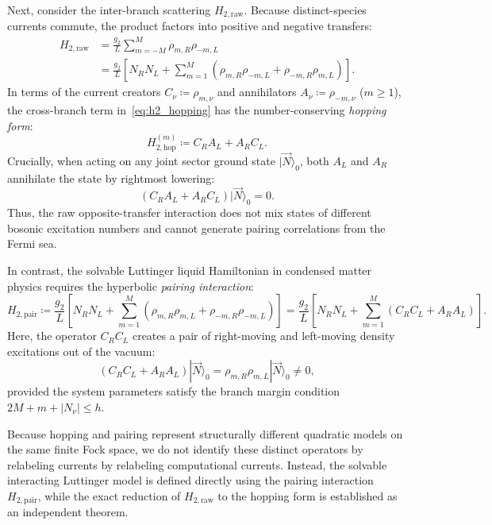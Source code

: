 Next, consider the inter-branch scattering $H_{2, \mathrm{raw}}$. Because distinct-species currents commute, the product factors into positive and negative transfers:
\begin{align}
H_{2, \mathrm{raw}} &= \frac{g_2}{L} \sum_{m=-M}^M \rho_{m, R} \rho_{-m, L} \\
&= \frac{g_2}{L} \left[ N_R N_L + \sum_{m=1}^M \left( \rho_{m, R} \rho_{-m, L} + \rho_{-m, R} \rho_{m, L} \right) \right]. \label{eq:h2_hopping}
\end{align}
In terms of the current creators $C_\nu \coloneqq \rho_{m, \nu}$ and annihilators $A_\nu \coloneqq \rho_{-m, \nu}$ ($m \ge 1$), the cross-branch term in~\eqref{eq:h2_hopping} has the number-conserving \emph{hopping form}:
\begin{equation}
H_{2, \mathrm{hop}}^{(m)} \coloneqq C_R A_L + A_R C_L.
\end{equation}
Crucially, when acting on any joint sector ground state $|\vec{N}\rangle_0$, both $A_L$ and $A_R$ annihilate the state by rightmost lowering:
\begin{equation}
\left( C_R A_L + A_R C_L \right) |\vec{N}\rangle_0 = 0.
\end{equation}
Thus, the raw opposite-transfer interaction does not mix states of different bosonic excitation numbers and cannot generate pairing correlations from the Fermi sea.

In contrast, the solvable Luttinger liquid Hamiltonian in condensed matter physics requires the hyperbolic \emph{pairing interaction}:
\begin{equation}
H_{2, \mathrm{pair}} \coloneqq \frac{g_2}{L} \left[ N_R N_L + \sum_{m=1}^M \left( \rho_{m, R} \rho_{m, L} + \rho_{-m, R} \rho_{-m, L} \right) \right] = \frac{g_2}{L} \left[ N_R N_L + \sum_{m=1}^M \left( C_R C_L + A_R A_L \right) \right].
\end{equation}
Here, the operator $C_R C_L$ creates a pair of right-moving and left-moving density excitations out of the vacuum:
\begin{equation}
\left( C_R C_L + A_R A_L \right) |\vec{N}\rangle_0 = \rho_{m, R} \rho_{m, L} |\vec{N}\rangle_0 \neq 0,
\end{equation}
provided the system parameters satisfy the branch margin condition $2M + m + |N_\nu| \le h$.

Because hopping and pairing represent structurally different quadratic models on the same finite Fock space, we do not identify these distinct operators by relabeling currents by relabeling computational currents. Instead, the solvable interacting Luttinger model is defined directly using the pairing interaction $H_{2, \mathrm{pair}}$, while the exact reduction of $H_{2, \mathrm{raw}}$ to the hopping form is established as an independent theorem.

